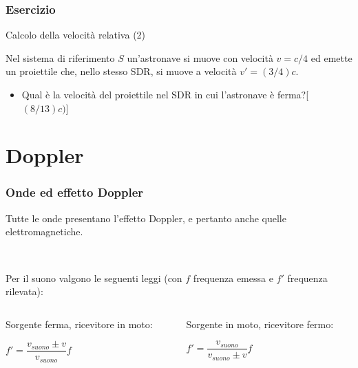 \documentclass[]{beamer}
\theoremstyle{plain}
\begin{document}
\begin{frame}
\frametitle{Esercizio}
\begin{exampleblock}{Calcolo della velocità relativa (2)}
\small{
  Nel sistema di riferimento $ S $ un'astronave si muove con velocità $ v = c/4 $ ed emette un proiettile che, nello stesso SDR, si muove a velocità $ v' = (3/4)c $.
  \begin{itemize}
    \item Qual è la velocità del proiettile nel SDR in cui l'astronave è ferma?\hspace*{\fill}[$ (8/13)c) $]
  \end{itemize}
  }
\end{exampleblock}
\end{frame}




\section{Doppler}

\begin{frame}
\frametitle{Onde ed effetto Doppler}

Tutte le onde presentano l'effetto Doppler, e pertanto anche quelle elettromagnetiche.{\pause}

~

Per il suono valgono le seguenti leggi (con $ f $ frequenza emessa e $ f' $ frequenza rilevata):
\begin{columns}
\begin{column}{0.5\textwidth}
\begin{center}
{\footnotesize Sorgente ferma, ricevitore in moto:}

\colorbox{blue!30}{$ f' = \dfrac{v_{suono} \pm v}{v_{suono}} f $}
\end{center}
\end{column}
\begin{column}{0.5\textwidth}
\begin{center}
{\footnotesize Sorgente in moto, ricevitore fermo:}

\colorbox{blue!30}{$ f' = \dfrac{v_{suono}}{v_{suono}  \pm v} f $}
\end{center}
\end{column}
\end{columns}
\end{frame}
\end{document}
